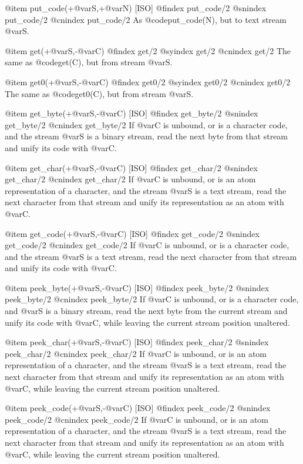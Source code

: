 {{{{{{@item put_code(+@var{S},+@var{N}) [ISO]
@findex put_code/2
@snindex put_code/2
@cnindex put_code/2
As @code{put_code(N)}, but to text stream @var{S}.

@item get(+@var{S},-@var{C})
@findex get/2
@syindex get/2
@cnindex get/2
The same as @code{get(C)}, but from stream @var{S}.

@item get0(+@var{S},-@var{C})
@findex get0/2
@syindex get0/2
@cnindex get0/2
The same as @code{get0(C)}, but from stream @var{S}.

@item get_byte(+@var{S},-@var{C}) [ISO]
@findex get_byte/2
@snindex get_byte/2
@cnindex get_byte/2
If @var{C} is unbound, or is a character code, and the stream @var{S} is a
binary stream, read the next byte from that stream and unify its
code with @var{C}.

@item get_char(+@var{S},-@var{C}) [ISO]
@findex get_char/2
@snindex get_char/2
@cnindex get_char/2
If @var{C} is unbound, or is an atom representation of a character, and
the stream @var{S} is a text stream, read the next character from that
stream and unify its representation as an atom with @var{C}.

@item get_code(+@var{S},-@var{C}) [ISO]
@findex get_code/2
@snindex get_code/2
@cnindex get_code/2
If @var{C} is unbound, or is a character code, and the stream @var{S} is a
text stream, read the next character from that stream and unify its
code with @var{C}.

@item peek_byte(+@var{S},-@var{C}) [ISO]
@findex peek_byte/2
@snindex peek_byte/2
@cnindex peek_byte/2
If @var{C} is unbound, or is a character code, and @var{S} is a binary
stream, read the next byte from the current stream and unify its code
with @var{C}, while leaving the current stream position unaltered.

@item peek_char(+@var{S},-@var{C}) [ISO]
@findex peek_char/2
@snindex peek_char/2
@cnindex peek_char/2
If @var{C} is unbound, or is an atom representation of a character, and
the stream @var{S} is a text stream, read the next character from that
stream and unify its representation as an atom with @var{C}, while leaving
the current stream position unaltered.

@item peek_code(+@var{S},-@var{C}) [ISO]
@findex peek_code/2
@snindex peek_code/2
@cnindex peek_code/2
If @var{C} is unbound, or is an atom representation of a character, and
the stream @var{S} is a text stream, read the next character from that
stream and unify its representation as an atom with @var{C}, while leaving
the current stream position unaltered.

}}}}}}
